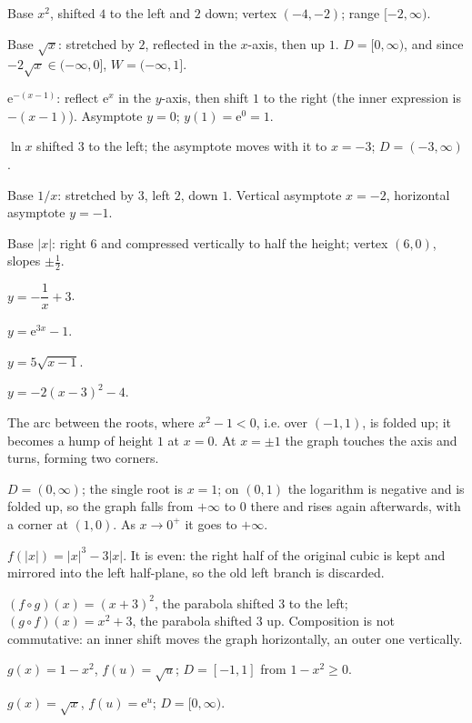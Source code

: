 \begin{solutions}
  \item Base $x^{2}$, shifted $4$ to the left and $2$ down; vertex
        $(-4,-2)$; range $[-2,\infty)$.
  \item Base $\sqrt{x}$: stretched by $2$, reflected in the $x$-axis, then
        up $1$. $D=[0,\infty)$, and since $-2\sqrt{x}\in(-\infty,0]$,
        $W=(-\infty,1]$.
  \item $\mathrm{e}^{-(x-1)}$: reflect $\mathrm{e}^{x}$ in the $y$-axis,
        then shift $1$ to the right (the inner expression is
        $-(x-1)$). Asymptote $y=0$; $y(1)=\mathrm{e}^{0}=1$.
  \item $\ln x$ shifted $3$ to the left; the asymptote moves with it to
        $x=-3$; $D=(-3,\infty)$.
  \item Base $1/x$: stretched by $3$, left $2$, down $1$. Vertical
        asymptote $x=-2$, horizontal asymptote $y=-1$.
  \item Base $|x|$: right $6$ and compressed vertically to half the height;
        vertex $(6,0)$, slopes $\pm\tfrac12$.
  \item $y=-\dfrac{1}{x}+3$.
  \item $y=\mathrm{e}^{3x}-1$.
  \item $y=5\sqrt{x-1}$.
  \item $y=-2(x-3)^{2}-4$.
  \item The arc between the roots, where $x^{2}-1<0$, i.e. over
        $(-1,1)$, is folded up; it becomes a hump of height $1$ at $x=0$.
        At $x=\pm1$ the graph touches the axis and turns, forming two
        corners.
  \item $D=(0,\infty)$; the single root is $x=1$; on $(0,1)$ the logarithm
        is negative and is folded up, so the graph falls from $+\infty$ to
        $0$ there and rises again afterwards, with a corner at $(1,0)$. As
        $x\to0^{+}$ it goes to $+\infty$.
  \item $f(|x|)=|x|^{3}-3|x|$. It is even: the right half of the original
        cubic is kept and mirrored into the left half-plane, so the old
        left branch is discarded.
  \item $(f\circ g)(x)=(x+3)^{2}$, the parabola shifted $3$ to the left;
        $(g\circ f)(x)=x^{2}+3$, the parabola shifted $3$ up. Composition
        is not commutative: an inner shift moves the graph horizontally, an
        outer one vertically.
  \item $g(x)=1-x^{2}$, $f(u)=\sqrt{u}$; $D=[-1,1]$ from $1-x^{2}\geq0$.
  \item $g(x)=\sqrt{x}$, $f(u)=\mathrm{e}^{u}$; $D=[0,\infty)$.

\end{solutions}
